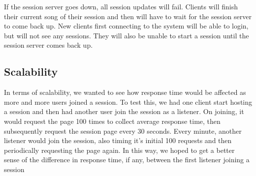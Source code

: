 If the session server goes down, all session updates will fail.
Clients will finish their current song of their session and then
will have to wait for the session server to come back up. New clients
first connecting to the system will be able to login, but will not
see any sessions. They will also be unable to start a session until
the session server comes back up.

\subsection{Scalability}
In terms of scalability, we wanted to see how response 
time would be affected as more and more users joined a session. 
To test this, we had one client start hosting a session and then had 
another user join the session as a listener. On joining, it would request 
the page 100 times to collect average response time, 
then subsequently request the session page every 30 seconds. 
Every minute, another listener would join the session, also timing it's initial 
100 requests and then periodically requesting the page again. In this way, 
we hoped to get a better sense of the difference in response time, if any, 
between the first listener joining a session


